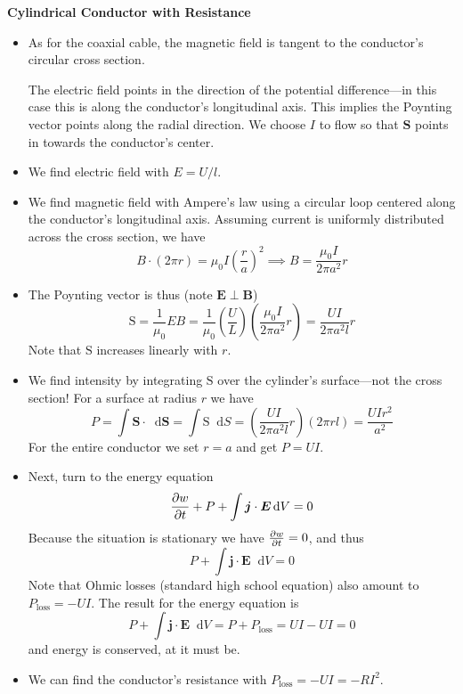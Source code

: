 \documentclass[11pt, a4paper]{article}
\newcommand{\diff}{\mathop{}\!\mathrm{d}} %
\renewcommand{\vec}[1]{\bm{#1}} %
\newcommand{\E}{\vec{E}}  %
\newcommand{\B}{\vec{B}}  %
\renewcommand{\S}{\mathbf{S}}  %
\renewcommand{\SS}{\mathrm{S}}  %
\newcommand{\mm}{\mu_{0}}  %
\newcommand{\m}{\vec{m}}  %
\newcommand{\Poy}{Poynting\xspace}
\begin{document}
\textbf{Cylindrical Conductor with Resistance}
\begin{itemize}
	\item As for the coaxial cable, the magnetic field is tangent to the conductor's circular cross section. 
	
	The electric field points in the direction of the potential difference---in this case this is along the conductor's longitudinal axis. This implies the \Poy vector points along the radial direction. We choose $ I $ to flow so that $ \S $ points in towards the conductor's center.
	
	\item We find electric field with $ E = U/l $.
	
	\item We find magnetic field with Ampere's law using a circular loop centered along the conductor's longitudinal axis. Assuming current is uniformly distributed across the cross section, we have 
	\begin{equation*}
		B \cdot (2\pi r) = \mm I \left(\frac{r}{a}\right)^{2} \implies B =  \frac{\mm I}{2\pi a^{2}}r
	\end{equation*}
	
	\item The \Poy vector is thus (note $ \E \perp \B $) 
	\begin{equation*}
		\SS = \frac{1}{\mm}E B = \frac{1}{\mm} \left(\frac{U}{L}\right)\left( \frac{\mm I}{2\pi a^{2}}r\right) = \frac{UI}{2\pi a^{2}l}r
	\end{equation*}
	Note that $ \SS $ increases linearly with $ r $. 
	
	\item We find intensity by integrating $ \SS $ over the cylinder's surface---not the cross section! For a surface at radius $ r $ we have
	\begin{equation*}
		P = \int \S \cdot \diff \vec{S} = \int \SS \diff S =  \left(\frac{UI}{2\pi a^{2}l}r\right) (2\pi r l) = \frac{UIr^{2}}{a^{2}}
	\end{equation*}
	For the entire conductor we set $ r = a $ and get $ P = UI $.
	
	\item Next, turn to the energy equation
	\begin{equation*}
		\pdv{w}{t} + P + \int \vec{j} \cdot \E \diff V = 0
	\end{equation*}
	Because the situation is stationary we have $ \pdv{w}{t} = 0$, and thus
	\begin{equation*}
		P + \int \vec{j} \cdot \E \diff V = 0
	\end{equation*}
	Note that Ohmic losses (standard high school equation) also amount to $ P_{\text{loss}} = -UI $. The result for the energy equation is
	\begin{equation*}
		P + \int \vec{j} \cdot \E \diff V =  P + P_{\text{loss}} = UI - UI = 0
	\end{equation*}
	and energy is conserved, at it must be. 
	
	\item We can find the conductor's resistance with $ P_{\text{loss}} = -UI = -RI^{2}$. 
\end{itemize}
\end{document}

